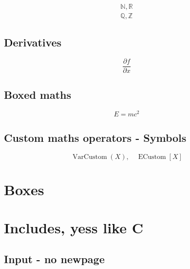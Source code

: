 \documentclass{article}
\DeclareMathOperator{\Var}{VarCustom}
\DeclareMathOperator{\E}{ECustom}
\begin{document}
\begin{align}
\mathbb{N}, \mathbb{R} \\
\mathbb{Q}, \mathbb{Z}
\end{align}

\subsection{Derivatives}

\[
\frac{\partial f}{\partial x}
\]

\subsection{Boxed maths}

\[
\boxed{E = mc^2}
\]


\subsection{Custom maths operators - Symbols}
 
\[
\Var(X), \quad \E[X]
\]

\section{Boxes}








\newpage

\section{Includes, yess like C}

\subsection{Input - no newpage}




\end{document}
